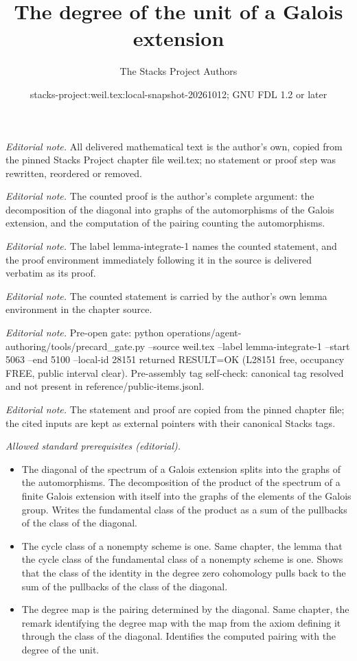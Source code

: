 \documentclass[10pt,a4paper]{amsart}
\title{The degree of the unit of a Galois extension}
\author{The Stacks Project Authors}
\date{stacks-project:weil.tex:local-snapshot-20261012; GNU FDL 1.2 or later}
\theoremstyle{plain}
\theoremstyle{definition}
\theoremstyle{remark}
\numberwithin{equation}{subsection}
\begin{document}
\maketitle
\noindent\textit{Editorial note.} All delivered mathematical text is the author's own, copied from the pinned Stacks Project chapter file weil.tex; no statement or proof step was rewritten, reordered or removed.\par\medskip
\noindent\textit{Editorial note.} The counted proof is the author's complete argument: the decomposition of the diagonal into graphs of the automorphisms of the Galois extension, and the computation of the pairing counting the automorphisms.\par\medskip
\noindent\textit{Editorial note.} The label lemma-integrate-1 names the counted statement, and the proof environment immediately following it in the source is delivered verbatim as its proof.\par\medskip
\noindent\textit{Editorial note.} The counted statement is carried by the author's own lemma environment in the chapter source.\par\medskip
\noindent\textit{Editorial note.} Pre-open gate: python operations/agent-authoring/tools/precard\_gate.py --source weil.tex --label lemma-integrate-1 --start 5063 --end 5100 --local-id 28151 returned RESULT=OK (L28151 free, occupancy FREE, public interval clear). Pre-assembly tag self-check: canonical tag resolved and not present in reference/public-items.jsonl.\par\medskip
\noindent\textit{Editorial note.} The statement and proof are copied from the pinned chapter file; the cited inputs are kept as external pointers with their canonical Stacks tags.\par\medskip
\noindent\textit{Allowed standard prerequisites (editorial).}\begin{itemize}
\item The diagonal of the spectrum of a Galois extension splits into the graphs of the automorphisms. The decomposition of the product of the spectrum of a finite Galois extension with itself into the graphs of the elements of the Galois group. Writes the fundamental class of the product as a sum of the pullbacks of the class of the diagonal.
\item The cycle class of a nonempty scheme is one. Same chapter, the lemma that the cycle class of the fundamental class of a nonempty scheme is one. Shows that the class of the identity in the degree zero cohomology pulls back to the sum of the pullbacks of the class of the diagonal.
\item The degree map is the pairing determined by the diagonal. Same chapter, the remark identifying the degree map with the map from the axiom defining it through the class of the diagonal. Identifies the computed pairing with the degree of the unit.
\end{itemize}\medskip
\end{document}
